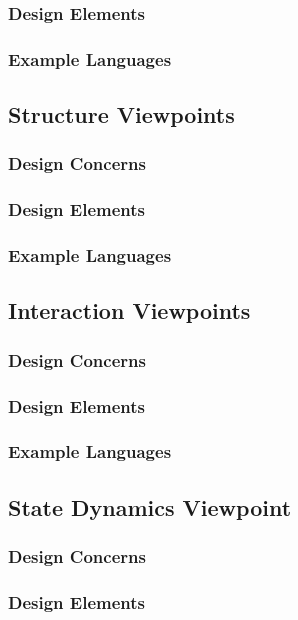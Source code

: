 \documentclass[letterpaper,10pt,titlepage,draftclsnofoot,onecolumn,onesided] {IEEEtran}
\begin{document}
\subsubsection{Design Elements}
\subsubsection{Example Languages}

\subsection{Structure Viewpoints}
\subsubsection{Design Concerns}
\subsubsection{Design Elements}
\subsubsection{Example Languages}

\subsection{Interaction Viewpoints}
\subsubsection{Design Concerns}
\subsubsection{Design Elements}
\subsubsection{Example Languages}

\subsection{State Dynamics Viewpoint}
\subsubsection{Design Concerns}
\subsubsection{Design Elements}
\end{document}
